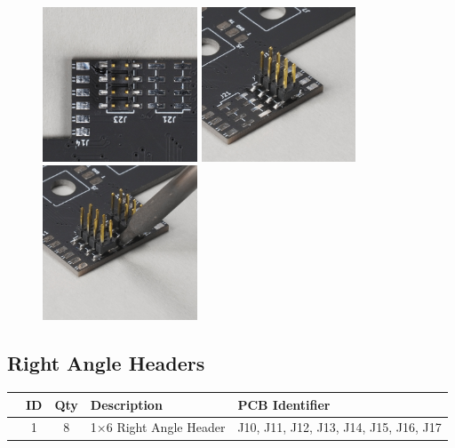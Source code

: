 \documentclass[12pt, a4paper]{article}
\newcommand{\checkbox}[1]{\CheckBox[backgroundcolor=0.86 0.828 0.71, name=#1]{}}
\begin{document}
\begin{figure}[H]
    \centering
    \includegraphics[width=46mm]{images/21_01_header_top_down.jpg}
    \hspace{2mm}
    \includegraphics[width=46mm]{images/21_02_header_sideview.jpg}
    \hspace{2mm}
    \includegraphics[width=46mm]{images/21_03_header_soldering.jpg}
\end{figure}

\pagebreak
\subsection{Right Angle Headers}

\begin{center}
    \small
    \setlength\extrarowheight{8pt}
    \begin{tabularx}{\textwidth}{|c|c|c|X|l|}
        \hline\rowcolor{lightgray} & ID & Qty & Description & PCB Identifier\\
        \hline\checkbox{ga} & 1 & 8 & 1×6 Right Angle Header & J10, J11, J12, J13, J14, J15, J16, J17\\
        \hline
    \end{tabularx}
\end{center}
\end{document}
